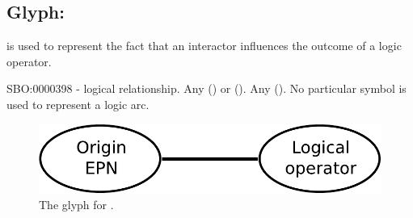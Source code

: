 \subsection{Glyph:  }\label{sec:logicArc}

 is used to represent the fact that an interactor influences
the outcome of a logic operator. 

\begin{glyphDescription}
 \glyphSboTerm SBO:0000398 - logical relationship.
 \glyphOrigin Any  () or  ().
 \glyphTarget Any  ().
 \glyphEndPoint No particular symbol is used to represent a logic arc.
 \end{glyphDescription}

\begin{figure}[H]
  \centering
  \includegraphics[scale = 0.4]{images/logicArc}
  \caption{The \PD glyph for .}
  \label{fig:logicArc}
\end{figure}
